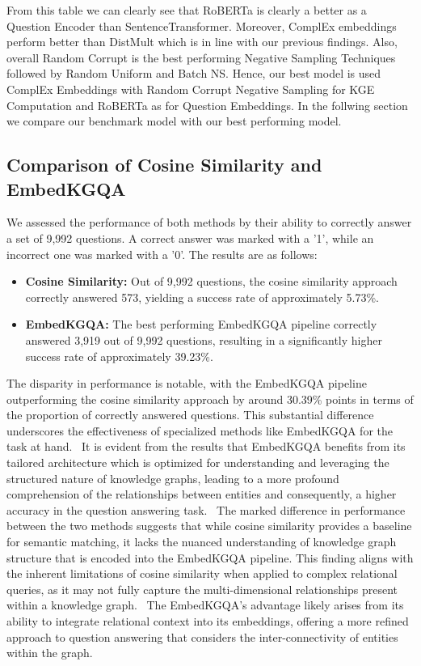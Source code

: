 \documentclass[12pt]{article}
\begin{document}
From this table we can clearly see that RoBERTa is clearly a better as a Question Encoder than SentenceTransformer. Moreover, ComplEx embeddings perform better than DistMult which is in line with our previous findings. Also, overall Random Corrupt is the best performing Negative Sampling Techniques followed by Random Uniform and Batch NS.
Hence, our best model is used ComplEx Embeddings with Random Corrupt Negative Sampling for KGE Computation and RoBERTa as for Question Embeddings. In the follwing section we compare our benchmark model with our best performing model.

\subsection{Comparison of Cosine Similarity and EmbedKGQA}
We assessed the performance of both methods by their ability to correctly answer a set of 9,992 questions. A correct answer was marked with a '1', while an incorrect one was marked with a '0'. The results are as follows:
\begin{itemize}
    \item \textbf{Cosine Similarity:} Out of 9,992 questions, the cosine similarity approach correctly answered 573, yielding a success rate of approximately 5.73\%.
    \item \textbf{EmbedKGQA:} The best performing EmbedKGQA pipeline correctly answered 3,919 out of 9,992 questions, resulting in a significantly higher success rate of approximately 39.23\%.
\end{itemize}

The disparity in performance is notable, with the EmbedKGQA pipeline outperforming the cosine similarity approach by around 30.39\% points in terms of the proportion of correctly answered questions. This substantial difference underscores the effectiveness of specialized methods like EmbedKGQA for the task at hand.
\
It is evident from the results that EmbedKGQA benefits from its tailored architecture which is optimized for understanding and leveraging the structured nature of knowledge graphs, leading to a more profound comprehension of the relationships between entities and consequently, a higher accuracy in the question answering task.
\
The marked difference in performance between the two methods suggests that while cosine similarity provides a baseline for semantic matching, it lacks the nuanced understanding of knowledge graph structure that is encoded into the EmbedKGQA pipeline. This finding aligns with the inherent limitations of cosine similarity when applied to complex relational queries, as it may not fully capture the multi-dimensional relationships present within a knowledge graph.
\
The EmbedKGQA's advantage likely arises from its ability to integrate relational context into its embeddings, offering a more refined approach to question answering that considers the inter-connectivity of entities within the graph.
\end{document}
